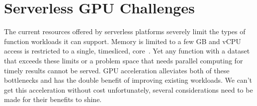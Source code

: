 \section{Serverless GPU Challenges}
\label{sec:motiv}

The current resources offered by serverless platforms severely limit the types of function workloads it can support.
Memory is limited to a few GB and vCPU access is restricted to a single, timesliced, core~\cite{lambda-limits}.
Yet any function with a dataset that exceeds these limits or a problem space that needs parallel computing for timely results cannot be served.
GPU acceleration alleviates both of these bottlenecks and has the double benefit of improving existing workloads. 
We can't get this acceleration without cost unfortunately, several considerations need to be made for their benefits to shine.

